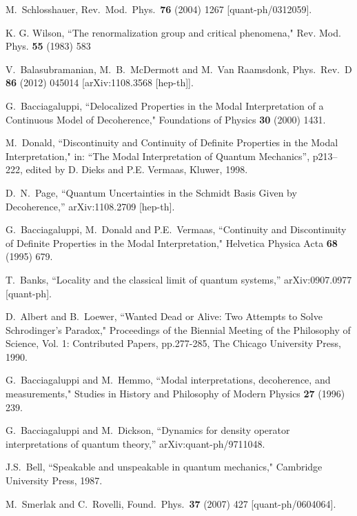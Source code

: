 \documentclass[12pt]{article}
\begin{document}
\begin{thebibliography}{99}
{ 
  M.~Schlosshauer,
  Rev.\ Mod.\ Phys.\  {\bf 76} (2004) 1267
  [quant-ph/0312059].
  
   
K. G. Wilson, ``The renormalization group and critical phenomena," Rev. Mod. Phys. {\bf55} (1983) 583

  
  V.~Balasubramanian, M.~B.~McDermott and M.~Van Raamsdonk,
  Phys.\ Rev.\ D {\bf 86} (2012) 045014
  [arXiv:1108.3568 [hep-th]].

 
G.~Bacciagaluppi, ``Delocalized Properties in the Modal Interpretation of a Continuous Model of Decoherence," Foundations of Physics {\bf30} (2000) 1431.
 

M.~Donald, ``Discontinuity and Continuity of Definite Properties in the Modal Interpretation," in: ``The Modal Interpretation of Quantum Mechanics'', p213--222, edited by D. Dieks and P.E. Vermaas, Kluwer, 1998.
 
 
  D.~N.~Page,
  ``Quantum Uncertainties in the Schmidt Basis Given by Decoherence,''
  arXiv:1108.2709 [hep-th].
  
G.~Bacciagaluppi, M.~Donald and P.E.~Vermaas, ``Continuity and Discontinuity of Definite Properties in the Modal Interpretation,"
Helvetica Physica Acta {\bf68} (1995) 679.  
 
  T.~Banks,
  ``Locality and the classical limit of quantum systems,''
  arXiv:0907.0977 [quant-ph].
 
D.~Albert and B.~Loewer,  ``Wanted Dead or Alive: Two Attempts to Solve Schrodinger's Paradox," Proceedings of the Biennial Meeting of the Philosophy of Science, Vol. 1: Contributed Papers, pp.277-285, The Chicago University Press, 1990.
 

G.~Bacciagaluppi and M.~Hemmo, ``Modal interpretations, decoherence, and measurements," Studies in History and Philosophy of Modern Physics {\bf 27} (1996) 239.

 
  G.~Bacciagaluppi and M.~Dickson,
  ``Dynamics for density operator interpretations of quantum theory,''
  arXiv:quant-ph/9711048.
  

J.S.~Bell,  ``Speakable and unspeakable in quantum mechanics," Cambridge University Press, 1987.

  M.~Smerlak and C.~Rovelli,
  Found.\ Phys.\  {\bf 37} (2007) 427
  [quant-ph/0604064].
 
}

\end{thebibliography}  
  
  
\end{document}
